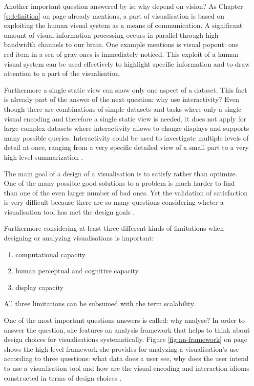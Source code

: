 
Another important question answered by \citeauthor{Munzner2014} is: why depend on vision? As Chapter \ref{s:definition} on page \pageref{s:definition} already mentions, a part of visualisation is based on exploiting the human visual system as a means of communication. A significant amount of visual information processing occurs in parallel through high-bandwidth channels to our brain. One example \citeauthor{Munzner2014} mentions is visual popout: one red item in a sea of gray ones is immediately noticed. This exploit of a human visual system can be used effectively to highlight specific information and to draw attention to a part of the visualisation.

Furthermore a single static view can show only one aspect of a dataset. This fact is already part of the answer of the next question: why use interactivity? Even though there are combinations of simple datasets and tasks where only a single visual encoding and therefore a single static view is needed, it does not apply for large complex datasets where interactivity allows to change displays and supports many possible queries. Interactivity could be used to investigate multiple levels of detail at once, ranging from a very specific detailed view of a small part to a very high-level summarization .

The main goal of a design of a visualisation is to satisfy rather than optimize. One of the many possible good solutions to a problem is much harder to find than one of the even larger number of bad ones. Yet the validation of satisfaction is very difficult because there are so many questions considering wheter a visualisation tool has met the design goals .

Furthermore considering at least three different kinds of limitations when designing or analyzing visualisations is important:
\begin{enumerate}
\item computational capacity
\item human perceptual and cognitive capacity
\item display capacity
\end{enumerate}

All three limitations can be subsumed with the term scalability.

One of the most important questions \citeauthor{Munzner2014} answers is called: why analyse? In order to answer the question, she features an analysis framework that helps to think about design choices for visualisations systematically. Figure \ref{fig:an-framework} on page \pageref{fig:an-framework} shows the high-level framework she provides for analyzing a visualisation's use according to three questions: what data does a user see, why does the user intend to use a visualisation tool and how are the visual encoding and interaction idioms constructed in terms of design choices .

